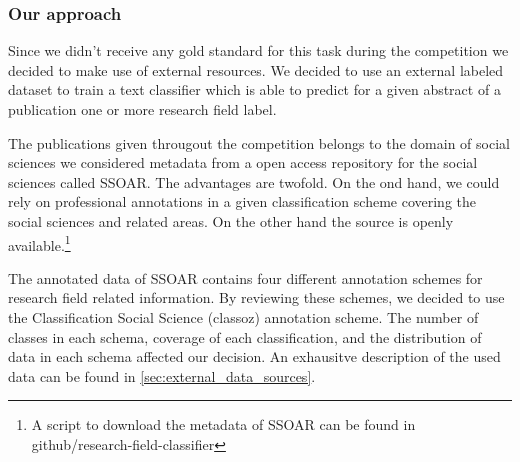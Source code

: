 \subsubsection{Our approach}
Since we didn't receive any gold standard for this task during the competition we decided to make use of external resources.
We decided to use an external labeled dataset to train a text classifier which is able to predict for a given abstract of a publication one or more research field label.

The publications given througout the competition belongs to the domain of social sciences we considered metadata from a open access repository for the social sciences called SSOAR.
The advantages are twofold.
On the ond hand, we could rely on professional annotations in a given classification scheme covering the social sciences and related areas.
On the other hand the source is openly available.\footnote{A script to download the metadata of SSOAR can be found in github/research-field-classifier}

The annotated data of SSOAR contains four different annotation schemes for research field related information. By reviewing these schemes, we decided to use the Classification Social Science (classoz) annotation scheme. The number of classes in each schema, coverage of each classification, and the distribution of data in each schema affected our decision. 
An exhausitve description of the used data can be found in \ref{sec:external_data_sources}.

